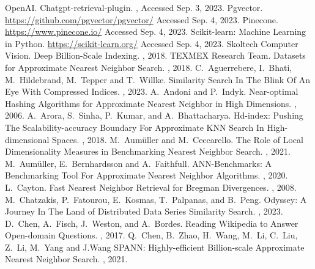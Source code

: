 \documentclass[11pt]{article}
\begin{document}
\begin{thebibliography}{10}
\itemsep=1pt
\begin{footnotesize}
 OpenAI. \newblock  Chatgpt-retrieval-plugin. , Accessed Sep. 3, 2023.
Pgvector. \newblock  \url{https://github.com/pgvector/pgvector/} \newblock  Accessed Sep. 4, 2023.
Pinecone. \newblock  \url{https://www.pinecone.io/} \newblock  Accessed Sep. 4, 2023.
Scikit-learn: Machine Learning in Python. \newblock \url{https://scikit-learn.org/} \newblock  Accessed Sep. 4, 2023.
Skoltech Computer Vision. \newblock  Deep Billion-Scale Indexing. , 2018.  
TEXMEX Research Team. \newblock  Datasets for Approximate Nearest Neighbor Search. , 2018.  
C.~Aguerrebere, I.~Bhati, M.~Hildebrand, M.~Tepper and T.~Willke. \newblock  Similarity Search In The Blink Of An Eye With Compressed Indices. , 2023.
A.~Andoni and P.~Indyk. \newblock  Near-optimal Hashing Algorithms for Approximate Nearest Neighbor in High Dimensions. , 2006.
A.~Arora, S.~Sinha, P.~Kumar, and A.~Bhattacharya. \newblock  Hd-index: Pushing The Scalability-accuracy Boundary For Approximate KNN Search In High-dimensional Spaces. , 2018.
M.~Aumüller and M.~Ceccarello. \newblock  The Role of Local Dimensionality Measures in Benchmarking Nearest Neighbor Search. , 2021.
M.~Aumüller, E.~Bernhardsson and A.~Faithfull. \newblock  ANN-Benchmarks: A Benchmarking Tool For Approximate Nearest Neighbor Algorithms. , 2020.
L.~Cayton. \newblock   Fast Nearest Neighbor Retrieval for Bregman Divergences. , 2008.  
M.~Chatzakis, P.~Fatourou, E.~Kosmas, T.~Palpanas, and B.~Peng. \newblock  Odyssey: A Journey In The Land of Distributed Data Series Similarity Search. , 2023.
 D.~Chen, A.~Fisch, J.~Weston, and A.~Bordes. \newblock  Reading Wikipedia to Answer Open-domain Questions. , 2017.
 Q.~Chen, B.~Zhao, H.~Wang, M.~Li, C.~Liu, Z.~Li, M.~Yang and J.Wang \newblock  SPANN: Highly-efficient Billion-scale Approximate Nearest Neighbor Search. , 2021.

\end{footnotesize}
\end{thebibliography}
\end{document}
